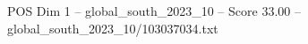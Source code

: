 \begin{textsample}{POS Dim 1 – global\_south\_2023\_10 – Score 33.00 – global\_south\_2023\_10/103037034.txt}
\end{textsample}
